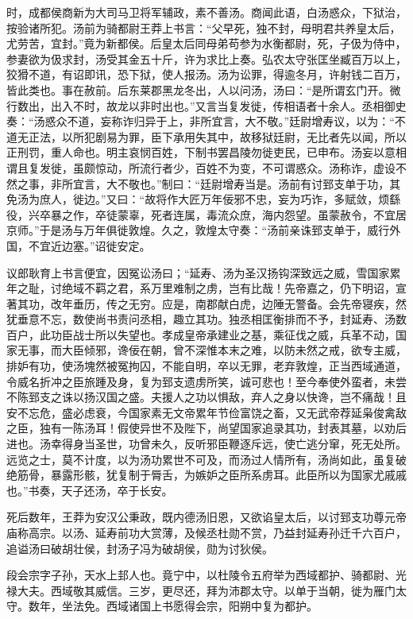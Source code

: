 \documentclass[12pt,UTF8]{ctexbook}
\begin{document}
时，成都侯商新为大司马卫将军辅政，素不善汤。商闻此语，白汤惑众，下狱治，按验诸所犯。汤前为骑都尉王莽上书言：“父早死，独不封，母明君共养皇太后，尤劳苦，宜封。”竟为新都侯。后皇太后同母弟苟参为水衡都尉，死，子伋为侍中，参妻欲为伋求封，汤受其金五十斤，许为求比上奏。弘农太守张匡坐臧百万以上，狡猾不道，有诏即讯，恐下狱，使人报汤。汤为讼罪，得逾冬月，许射钱二百万，皆此类也。事在赦前。后东莱郡黑龙冬出，人以问汤，汤曰：“是所谓玄门开。微行数出，出入不时，故龙以非时出也。”又言当复发徙，传相语者十余人。丞相御史奏：“汤惑众不道，妄称诈归异于上，非所宜言，大不敬。”廷尉增寿议，以为：“不道无正法，以所犯剧易为罪，臣下承用失其中，故移狱廷尉，无比者先以闻，所以正刑罚，重人命也。明主哀悯百姓，下制书罢昌陵勿徙吏民，已申布。汤妄以意相谓且复发徙，虽颇惊动，所流行者少，百姓不为变，不可谓惑众。汤称诈，虚设不然之事，非所宜言，大不敬也。”制曰：“廷尉增寿当是。汤前有讨郅支单于功，其免汤为庶人，徙边。”又曰：“故将作大匠万年佞邪不忠，妄为巧诈，多赋敛，烦繇役，兴卒暴之作，卒徒蒙辜，死者连属，毒流众庶，海内怨望。虽蒙赦令，不宜居京师。”于是汤与万年俱徙敦煌。久之，敦煌太守奏：“汤前亲诛郅支单于，威行外国，不宜近边塞。”诏徙安定。



议郎耿育上书言便宜，因冤讼汤曰；“延寿、汤为圣汉扬钩深致远之威，雪国家累年之耻，讨绝域不羁之君，系万里难制之虏，岂有比哉！先帝嘉之，仍下明诏，宣著其功，改年垂历，传之无穷。应是，南郡献白虎，边陲无警备。会先帝寝疾，然犹垂意不忘，数使尚书责问丞相，趣立其功。独丞相匡衡排而不予，封延寿、汤数百户，此功臣战士所以失望也。孝成皇帝承建业之基，乘征伐之威，兵革不动，国家无事，而大臣倾邪，谗佞在朝，曾不深惟本末之难，以防未然之戒，欲专主威，排妒有功，使汤塊然被冤拘囚，不能自明，卒以无罪，老弃敦煌，正当西域通道，令威名折冲之臣旅踵及身，复为郅支遗虏所笑，诚可悲也！至今奉使外蛮者，未尝不陈郅支之诛以扬汉国之盛。夫援人之功以惧敌，弃人之身以快谗，岂不痛哉！且安不忘危，盛必虑衰，今国家素无文帝累年节俭富饶之畜，又无武帝荐延枭俊禽敌之臣，独有一陈汤耳！假使异世不及陛下，尚望国家追录其功，封表其墓，以劝后进也。汤幸得身当圣世，功曾未久，反听邪臣鞭逐斥远，使亡逃分窜，死无处所。远览之士，莫不计度，以为汤功累世不可及，而汤过人情所有，汤尚如此，虽复破绝筋骨，暴露形骸，犹复制于脣舌，为嫉妒之臣所系虏耳。此臣所以为国家尤戚戚也。”书奏，天子还汤，卒于长安。



死后数年，王莽为安汉公秉政，既内德汤旧恩，又欲谄皇太后，以讨郅支功尊元帝庙称高宗。以汤、延寿前功大赏薄，及候丞杜勋不赏，乃益封延寿孙迁千六百户，追谥汤曰破胡壮侯，封汤子冯为破胡侯，勋为讨狄侯。



段会宗字子孙，天水上邽人也。竟宁中，以杜陵令五府举为西域都护、骑都尉、光禄大夫。西域敬其威信。三岁，更尽还，拜为沛郡太守。以单于当朝，徙为雁门太守。数年，坐法免。西域诸国上书愿得会宗，阳朔中复为都护。
\end{document}
